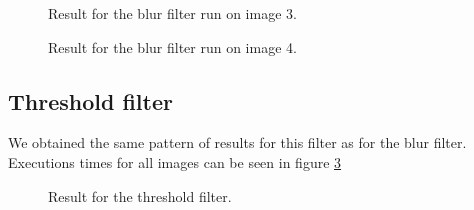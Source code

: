 \documentclass[titlepage, a4paper]{article}
\begin{document}
\begin{figure}[H]
  \centering
  \caption{Result for the blur filter run on image 3.}
  \label{fig:im3-blur}
\end{figure}

\begin{figure}[H]
  \centering
  \caption{Result for the blur filter run on image 4.}
  \label{fig:im4-blur}
\end{figure}


\subsection{Threshold filter}
We obtained the same pattern of results for this filter as for the blur filter. Executions times for all images can be seen in figure \ref{fig:threshold}

\begin{figure}[H]
  \centering
  \caption{Result for the threshold filter.}
  \label{fig:threshold}
\end{figure}
\end{document}
